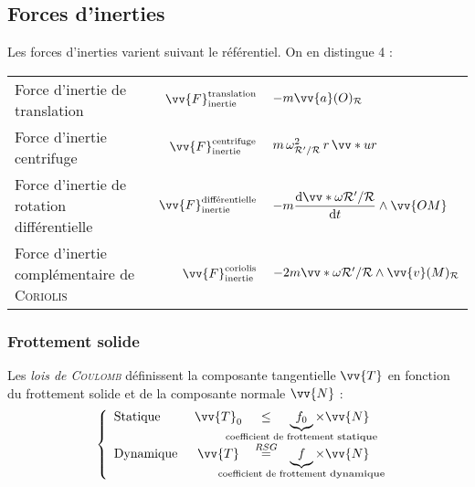 \documentclass[11pt,a4paper,fleqn,pdftex]{report}
\begin{document}
\subsection{Forces d'inerties} %
\label{sub:forces_d_inerties}
Les forces d'inerties varient suivant le référentiel. On en distingue 4 : \\[0.8\baselineskip]
\renewcommand\arraystretch{2} \setlength\minrowclearance{2pt}
\begin{tabular}{|b r@{$\: = \: $}l|}\hline
  Force d'inertie de translation & $\vv{F}_\text{inertie}^{\text{translation}}$&$-m\vv{a}(O)_{\mathcal{R}} $ \\
  Force d'inertie centrifuge & $\vv{F}_\text{inertie}^{\text{centrifuge}} $&$ m\, \omega^2_{\mathcal{R'}/\mathcal{R}} \, r \, \vv*{u}{r} $\\
  Force d'inertie de rotation différentielle & $\vv{F}_\text{inertie}^{\text{différentielle}}$ & $-m \dfrac{\d \vv*{\omega}{\mathcal{R'}/\mathcal{R}}}{\d t} \wedge \vv{OM} $ \\
  Force d'inertie complémentaire de \textsc{Coriolis}\index{Force!Coriolis@\emphi{de }\textsc{Coriolis}} & $\vv{F}_\text{inertie}^{\text{coriolis}}$&$ -2 m \vv*{\omega}{\mathcal{R'}/\mathcal{R}} \wedge \vv{v}(M)_\mathcal{R} $\\
  \hline
\end{tabular}
\subsubsection{Frottement solide} %
\label{ssub:frottement_solide}
\begin{itheorem}
   Les \emph{lois de \textsc{Coulomb}} définissent la composante tangentielle $\vv{T}$ en fonction du frottement solide et de la composante normale $\vv{N}$ : \\
    \begin{equation}\label{Lois de Coulomb}
      \left\lbrace
      \begin{array}{l c c l}
      \text{Statique }&\vv{T}_0&\le & \underbrace{f_0}_{\mathclap{\text{coefficient de frottement \emphh{statique}}}}\times\vv{N}\\
      \text{Dynamique }&\vv{T}&\overset{RSG}{=}&\underbrace{f}_{\mathclap{\text{coefficient de frottement \emphh{dynamique}}}}\times\vv{N}\\
      \end{array}
      \right.
    \end{equation}
\end{itheorem}
\end{document}
